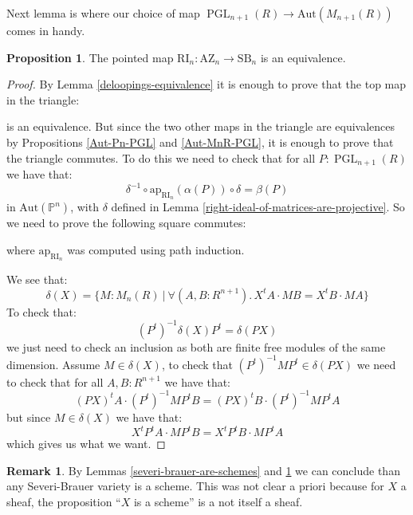 \documentclass[10pt,a4paper]{article}
\theoremstyle{definition}
\newtheorem{remark}[theorem]{Remark}
\newtheorem{proposition}[theorem]{Proposition}
\DeclareMathOperator{\PGL}{PGL}
\newcommand{\SB}{\mathrm{SB}}
\newcommand{\RI}{\mathrm{RI}}
\newcommand{\AZ}{\mathrm{AZ}}
\newcommand{\bP}{\mathbb{P}}
\newcommand{\Aut}{\mathrm{Aut}}
\begin{document}
Next lemma is where our choice of map $\PGL_{n+1}(R)\to \Aut(M_{n+1}(R))$ comes in handy.

\begin{proposition}\label{right-ideal-is-equivalence}
The pointed map $\RI_n:\AZ_n\to\SB_n$ is an equivalence.
\end{proposition}

\begin{proof}
By Lemma \ref{deloopings-equivalence} it is enough to prove that the top map in the triangle:
\begin{center}
\end{center}
is an equivalence. But since the two other maps in the triangle are equivalences by Propositions \ref{Aut-Pn-PGL} and \ref{Aut-MnR-PGL}, it is enough to prove that the triangle commutes. To do this we need to check that for all $P:\PGL_{n+1}(R)$ we have that:
\[\delta^{-1}\circ \mathrm{ap}_{\RI_n}(\alpha(P))\circ\delta = \beta(P)\]
in $\Aut(\bP^n)$, with $\delta$ defined in Lemma \ref{right-ideal-of-matrices-are-projective}. So we need to prove the following square commutes:
\begin{center}
\end{center}
where $\mathrm{ap}_{\RI_n}$ was computed using path induction.

We see that:
\[\delta(X) = \{M:M_n(R)\ |\ \forall (A,B:R^{n+1}).\, X^tA\cdot MB = X^tB\cdot MA\}\]
To check that:
\[(P^t)^{-1}\delta(X)P^t = \delta(PX)\]
we just need to check an inclusion as both are finite free modules of the same dimension. Assume $M\in\delta(X)$, to check that $(P^t)^{-1}MP^t\in\delta(PX)$ we need to check that for all $A,B:R^{n+1}$ we have that:
\[(PX)^tA \cdot (P^t)^{-1}MP^tB = (PX)^tB \cdot (P^t)^{-1}MP^tA \]
but since $M\in\delta(X)$ we have that:
\[X^tP^tA \cdot MP^tB = X^tP^tB\cdot MP^tA \]
which gives us what we want.
\end{proof}

\begin{remark}
By Lemmas \ref{severi-brauer-are-schemes} and \ref{right-ideal-is-equivalence} we can conclude than any Severi-Brauer variety is a scheme. This was not clear a priori because for $X$ a sheaf, the proposition ``$X$ is a scheme'' is a not itself a sheaf.
\end{remark}
\end{document}

